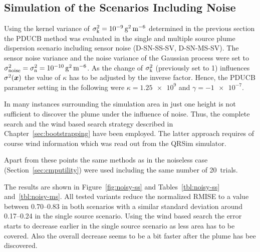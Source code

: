 \subsection{Simulation of the Scenarios Including Noise}
Using the kernel variance of $\sigma\ped{k}^2 
= \SI{1e-9}{\gram\squared\per\meter\tothe{6}}$ determined in the previous 
section the PDUCB method was evaluated in the single and multiple source plume 
dispersion scenario including sensor noise (D-SN-SS-SV, D-SN-MS-SV). The sensor 
noise variance and the noise variance of the Gaussian process were set to 
$\sigma\ped{noise}^2 = \sigma\ped{n}^2 
= \SI{1e-10}{\gram\squared\per\meter\tothe{6}}$.  As the change of 
$\sigma_{\mathrm{k}}^2$ (previously set to 1) influences $\sigma^2(\bm{x})$ the value 
of $\kappa$ has to be adjusted by the inverse factor. Hence, the PDUCB parameter 
setting in the following were $\kappa = \num{1.25e9}$ and $\gamma 
= \num{-1e-7}$.

In many instances surrounding the simulation area in just one height is not 
sufficient to discover the plume under the influence of noise. Thus, the 
complete search and the wind based search strategy described in 
Chapter~\ref{sec:bootstrapping} have been employed. The latter approach requires 
of course wind information which was read out from the QRSim simulator.

Apart from these points the same methods as in the noiseless case 
(Section~\ref{sec:cmputility}) were used including the same number of 20~trials.

The results are shown in Figure~\ref{fig:noisy-ss} and Tables~\ref{tbl:noisy-ss} 
and~\ref{tbl:noisy-ms}. All tested variants reduce the normalized RMISE to 
a value between \numrange{0.70}{0.83} in both scenarios with a similar standard 
deviation around \numrange{0.17}{0.24} in the single source scenario.  Using the 
wind based search the error starts to decrease earlier in the single source 
scenario as less area has to be covered.  Also the overall decrease seems to be 
a bit faster after the plume has bee discovered.

